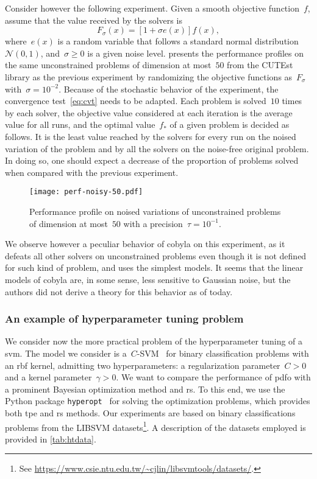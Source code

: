 \documentclass[11pt,draft]{article}
\numberwithin{equation}{section}
\newcommand{\obj}{f}
\begin{document}
Consider however the following experiment.
Given a smooth objective function~$\obj$, assume that the value received by the solvers is
\begin{equation*}
    F_{\sigma}(x) = [1 + \sigma e(x)] \obj(x),
\end{equation*}
where~$e(x)$ is a random variable that follows a standard normal distribution~$\mathcal{N}(0, 1)$, and~$\sigma \ge 0$ is a given noise level.
 presents the performance profiles on the same unconstrained problems of dimension at most~$50$ from the CUTEst library as the previous experiment by randomizing the objective functions as~$F_{\sigma}$ with~$\sigma = 10^{-2}$.
Because of the stochastic behavior of the experiment, the convergence test~\cref{eq:cvt} needs to be adapted.
Each problem is solved~$10$ times by each solver, the objective value considered at each iteration is the average value for all runs, and the optimal value~$f_{\ast}$ of a given problem is decided as follows.
It is the least value reached by the solvers for every run on the noised variation of the problem and by all the solvers on the noise-free original problem.
In doing so, one should expect a decrease of the proportion of problems solved when compared with the previous experiment.

\begin{figure}[ht]
    \centering
    \texttt{[image: perf-noisy-50.pdf]}
    \caption{Performance profile on noised variations of unconstrained problems of dimension at most~$50$ with a precision~$\tau = 10^{-1}$.}
    \label{fig:ppun-50}
\end{figure}

We observe however a peculiar behavior of \gls{cobyla} on this experiment, as it defeats all other solvers on unconstrained problems even though it is not defined for such kind of problem, and uses the simplest models.
It seems that the linear models of \gls{cobyla} are, in some sense, less sensitive to Gaussian noise, but the authors did not derive a theory for this behavior as of today.

\subsubsection{An example of hyperparameter tuning problem}

We consider now the more practical problem of the hyperparameter tuning of a \gls{svm}.
The model we consider is a~$C$-SVM~\cite{Chang_Lin_2011} for binary classification problems with an \gls{rbf} kernel, admitting two hyperparameters: a regularization parameter~$C > 0$ and a kernel parameter~$\gamma > 0$.
We want to compare the performance of \gls{pdfo} with a prominent Bayesian optimization method and \gls{rs}.
To this end, we use the Python package \texttt{hyperopt}~\cite{Bergstra_Yamins_Cox_2013} for solving the optimization problems, which provides both \gls{tpe} and \gls{rs} methods.
Our experiments are based on binary classifications problems from the LIBSVM datasets\footnote{See \url{https://www.csie.ntu.edu.tw/~cjlin/libsvmtools/datasets/}.}.
A description of the datasets employed is provided in \cref{tab:htdata}.
\end{document}

